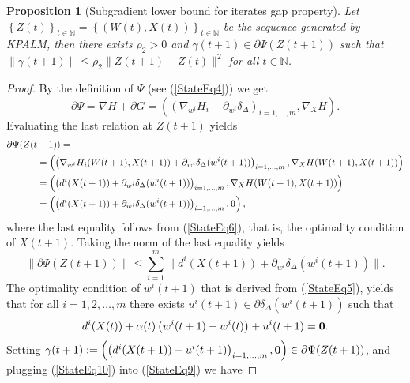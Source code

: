 \documentclass[11pt]{article}
\numberwithin{equation}{section}
\newtheorem{proposition}{Proposition}[section]
\begin{document}
\begin{proposition}[Subgradient lower bound for iterates gap property]
Let $\left\lbrace Z(t) \right\rbrace_{t \in \mathbb{N}} = \left\lbrace (W(t) , X(t)) \right\rbrace_{t \in \mathbb{N}}$ be the sequence generated by KPALM, then there exists $\rho_2 > 0$ and $\gamma(t+1) \in \partial \Psi(Z(t+1))$ such that $\| \gamma(t+1)\| \leq \rho_2 \|Z(t+1) - Z(t)\|^2$ for all $t \in \mathbb{N} $.
\end{proposition}

\begin{proof}
By the definition of $\Psi$ (see (\ref{StateEq4})) we get
\begin{equation*}
	\partial \Psi = \nabla H + \partial G  
= \left( \left( \nabla_{w^i} H_i + \partial_{w^i} \delta_{\Delta} \right)_{i=1, \ldots ,m} , \nabla_X H \right) .
\end{equation*}
Evaluating the last relation at $Z(t+1)$ yields
\begin{equation*}
\begin{aligned}
	\partial \Psi(Z(t & + 1)) = \\
	& = \left( \left( \nabla_{w^i} H_i(W(t+1),X(t+1)) + \partial_{w^i} \delta_{\Delta}(w^i(t+1)) \right)_{i=1, \ldots ,m} , \nabla_X H(W(t+1),X(t+1)) \right) \\
	& = \left( \left( d^i(X(t+1)) + \partial_{w^i} \delta_{\Delta}(w^i(t+1)) \right)_{i=1, \ldots ,m} , \nabla_X H(W(t+1),X(t+1)) \right) \\
	& = \left( \left( d^i(X(t+1)) + \partial_{w^i} \delta_{\Delta}(w^i(t+1)) \right)_{i=1, \ldots ,m} , \bf{0} \right) ,
\end{aligned}
\end{equation*}
where the last equality follows from (\ref{StateEq6}), that is, the optimality condition of $X(t+1)$. Taking the norm of the last equality yields
\begin{equation}
	\| \partial \Psi(Z(t+1))\| 
	\leq \sum\limits_{i=1}^{m} \| d^i(X(t+1)) + \partial_{w^i} \delta_{\Delta}(w^i(t+1)) \|. \label{StateEq9}
\end{equation}
The optimality condition of $w^i(t+1)$ that is derived from (\ref{StateEq5}), yields that for all $i=1, 2, \ldots ,m$ there exists $u^i(t+1) \in \partial \delta_{\Delta}(w^i(t+1))$ such that
\begin{equation}
	d^i(X(t)) + \alpha(t) \left( w^i(t+1) - w^i(t) \right) + u^i(t+1) = \bf{0} . \label{StateEq10}
\end{equation}
Setting $\gamma(t+1) := \left( \left( d^i(X(t+1)) + u^i(t+1) \right)_{i=1, \ldots ,m}, \bf{0} \right) \in \partial \Psi(Z(t+1))$, and plugging (\ref{StateEq10}) into (\ref{StateEq9}) we have

\end{proof}
\end{document}
